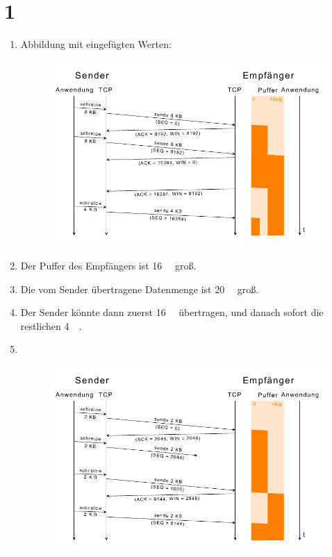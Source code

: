 \documentclass[ngerman]{scrartcl}
\begin{document}
\section*{1}
	\begin{enumerate}[label=\alph*)]
    \item
    Abbildung mit eingefügten Werten:

    \begin{figure}[ht]
      \centering
      \includegraphics{uebung6-1a.pdf}
    \end{figure}

    \item
    Der Puffer des Empfängers ist \SI{16}{\kilo\byte} groß.

    \item
    Die vom Sender übertragene Datenmenge ist \SI{20}{\kilo\byte} groß.

    \item
    Der Sender könnte dann zuerst \SI{16}{\kilo\byte} übertragen, und danach sofort die restlichen \SI{4}{\kilo\byte}.

    \newpage

    \item
    \ 
    \begin{figure}[ht]
      \centering
      \includegraphics{uebung6-1e.pdf}
    \end{figure}
  \end{enumerate}
\end{document}
